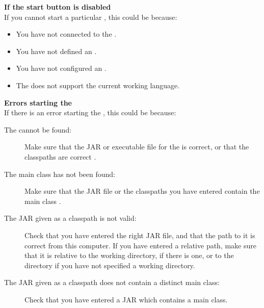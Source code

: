 % 
%
%
\textbf{If the start \gdaut{} button is disabled}\\
If you cannot start a particular \gdaut{}, this could be because:

\begin{itemize}
\item You have not connected to the \gdagent{} .
\item You have not defined an \gdaut{} .
\item You have not configured an \gdaut{} .
\item The \gdaut{} does not support the current working language. 
\end{itemize}

\textbf{Errors starting the \gdaut{}}\\
If there is an error starting the \gdaut{}, this could be because:
\begin{description}
\item [The \gdaut{} cannot be found:]{Make sure that the JAR or executable file for the \gdaut{} is correct, or that the classpaths are correct .}
\item [The main class has not been found:]{Make sure that the JAR file or the classpaths you have entered contain the main class . }
\item[The JAR given as a classpath is not valid:]{Check that you have entered the right JAR file, and that the path to it is correct from this computer. If you have entered a relative path, make sure that it is relative to the \gdaut{} working directory, if there is one, or to the \gdagent directory if you have not specified a \gdaut{} working directory. }
\item[The JAR given as a classpath does not contain a distinct  main 
class:]{Check that you have entered a JAR which contains a main class.}
\end{description}

